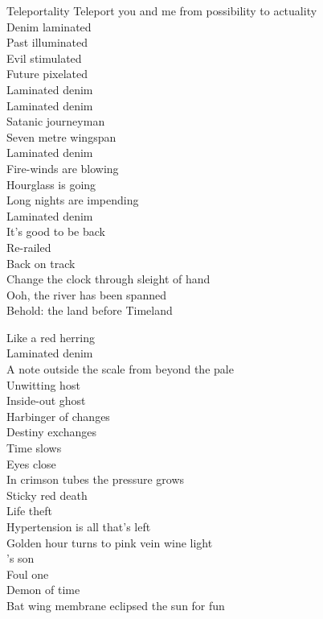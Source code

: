 Teleportality
Teleport you and me from possibility to actuality\\
Denim laminated\\
Past illuminated\\
Evil stimulated\\
Future pixelated\\

Laminated denim\\

Laminated denim\\
Satanic journeyman\\
Seven metre wingspan\\
Laminated denim\\
Fire-winds are blowing\\
Hourglass is going\\
Long nights are impending\\
Laminated denim\\

It's good to be back\\
Re-railed\\
Back on track\\
Change the clock through sleight of hand\\
Ooh, the river has been spanned\\
Behold: the land before Timeland\\




Like a red herring\\
Laminated denim\\
A note outside the scale from beyond the pale\\
Unwitting host\\
Inside-out ghost\\
Harbinger of changes\\
Destiny exchanges\\
Time slows\\
Eyes close\\
In crimson tubes the pressure grows\\
Sticky red death\\
Life theft\\
Hypertension is all that's left\\

Golden hour turns to pink vein wine light\\
's son\\
Foul one\\
Demon of time\\
Bat wing membrane eclipsed the sun for fun\\

